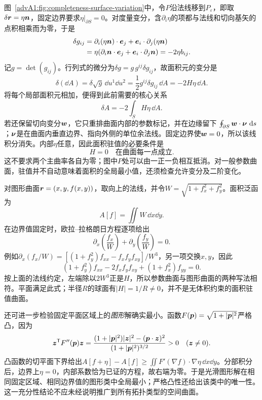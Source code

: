 图~\ref{advA1:fig:completeness-surface-variation}中，令$P$沿法线移到$P_\varepsilon$，即取$\delta\bm{r}=\eta\bm{n}$，固定边界要求$\eta|_{\partial S}=0$。对度量变分，含$\partial_i\eta$的项都与法线和切向基矢的点积相乘而为零，于是
\begin{align*}
 \delta g_{ij}
 &=\partial_i(\eta\bm{n})\cdot\bm{e}_j
   +\bm{e}_i\cdot\partial_j(\eta\bm{n})\\
 &=\eta(\partial_i\bm{n}\cdot\bm{e}_j+
                \bm{e}_i\cdot\partial_j\bm{n})
 =-2\eta b_{ij}.
\end{align*}
记$g=\det(g_{ij})$。行列式的微分为$\delta g=g\,g^{ij}\delta g_{ij}$，故面积元的变分是
\[
 \delta(\dd A)=\delta\sqrt g\,\dd u^1\dd u^2
 =\frac12g^{ij}\delta g_{ij}\,\dd A
 =-2H\eta\,\dd A.
\]
将每个局部面积元相加，便得到此前需要的核心关系
\[
 \delta A=-2\int_S H\eta\,\dd A.
\]
若还保留切向变分$\bm{w}$，它只重排曲面内部的参数标记，并在边缘留下
$\oint_{\partial S}\bm{w}\cdot\bm{\nu}\,\mathop{}\!\mathrm d s$；$\bm{\nu}$是在曲面内垂直边界、指向外侧的单位余法线。固定边界使$\bm{w}=0$，所以该线积分消失。内部$\eta$任意，因此面积驻值的必要条件是
\[
 \boxed{H=0\quad\text{在曲面每一点成立}}.
\]
这不要求两个主曲率各自为零；图中$P$处可以由一正一负相互抵消。对一般参数曲面，驻值并不自动意味着面积的全局最小值，还须检查允许变分及二阶变化。

对图形曲面$\bm{r}=(x,y,f(x,y))$，取向上的法线，并令$W=\sqrt{1+f_x^2+f_y^2}$。面积泛函为
\[
 A[f]=\iint W\,\dd x\dd y.
\]
在边界值固定时，欧拉--拉格朗日方程逐项给出
\[
 \partial_x\left(\frac{f_x}{W}\right)
 +\partial_y\left(\frac{f_y}{W}\right)=0.
\]
例如$\partial_x(f_x/W)=[(1+f_y^2)f_{xx}-f_xf_yf_{xy}]/W^3$，另一项交换$x,y$，因此
\[
 \boxed{(1+f_y^2)f_{xx}-2f_xf_yf_{xy}+(1+f_x^2)f_{yy}=0}.
\]
按上面的法线约定，左端除以$2W^3$正是$H$，所以参数曲面与图形曲面的两种写法相符。平面满足此式；半径$R$的球面有$|H|=1/R\ne0$，并不是无体积约束的面积驻值曲面。

还可进一步检验固定平面区域上的\emph{图形}解确实最小。函数$F(\bm{p})=\sqrt{1+|\bm{p}|^2}$严格凸，因为
\[
 \bm{z}^{\mathsf T}F''(\bm{p})\bm{z}
 =\frac{(1+|\bm{p}|^2)|\bm{z}|^2-(\bm{p}\cdot\bm{z})^2}
        {(1+|\bm{p}|^2)^{3/2}}>0\quad(\bm{z}\ne0).
\]
凸函数的切平面下界给出$A[f+\eta]-A[f]\ge\iint F'(\nabla f)\cdot\nabla\eta\,\dd x\dd y$。分部积分后，边界上$\eta=0$，内部系数恰为已证的方程，故右端为零。于是光滑图形解在相同固定区域、相同边界值的图形类中全局最小；严格凸性还给出该类中的唯一性。这一充分性结论不应未经说明推广到所有拓扑类型的空间曲面。
